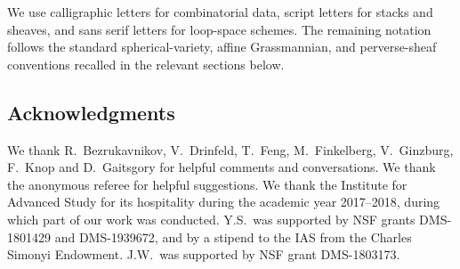 \begin{remark}[Notation]
\label{index:notation}
We use calligraphic letters for combinatorial data, script letters for
stacks and sheaves, and sans serif letters for loop-space schemes.  The
remaining notation follows the standard spherical-variety, affine
Grassmannian, and perverse-sheaf conventions recalled in the relevant
sections below.
\end{remark}





\subsection{Acknowledgments}

We thank R.~Bezrukavnikov, V.~Drinfeld, T.~Feng, M.~Finkelberg, V.~Ginzburg, F.~Knop and D.~Gaitsgory for helpful comments and conversations. We thank the anonymous referee for helpful suggestions. We thank the Institute for Advanced Study for its hospitality during the academic year 2017--2018, during which part of our work was conducted. Y.S.~was supported by NSF grants DMS-1801429 and DMS-1939672, and by a stipend to the IAS from the Charles Simonyi Endowment.
J.W.~was supported by NSF grant DMS-1803173.
